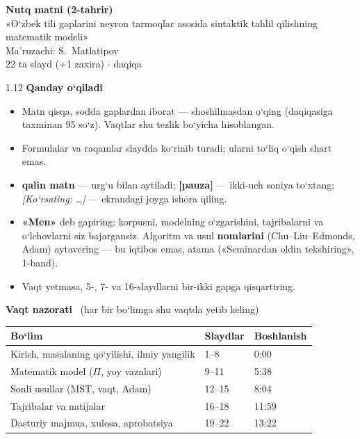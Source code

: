 \documentclass[14pt,a4paper]{extarticle}
\begin{document}
\begin{center}
  {\LARGE\bfseries Nutq matni (2-tahrir)}\\[0.3em]
  {\large «O‘zbek tili gaplarini neyron tarmoqlar asosida sintaktik tahlil
  qilishning matematik modeli»}\\[0.3em]
  {\normalsize Ma’ruzachi: S.~Matlatipov\\
  22 ta slayd (+1 zaxira) \quad$\cdot$ daqiqa}
\end{center}

\begin{spacing}{1.12}
\noindent\textbf{Qanday o‘qiladi}
\begin{itemize}[itemsep=1pt]
  \item Matn qisqa, sodda gaplardan iborat --- shoshilmasdan o‘qing (daqiqasiga
        taxminan 95 so‘z). Vaqtlar shu tezlik bo‘yicha hisoblangan.
  \item Formulalar va raqamlar slaydda ko‘rinib turadi; ularni to‘liq o‘qish shart emas.
  \item \textbf{qalin matn} --- urg‘u bilan aytiladi;
        \textbf{[pauza]} --- ikki-uch soniya to‘xtang;
        {\small\itshape [Ko‘rsating: \dots]} --- ekrandagi joyga ishora qiling.
  \item \textbf{«Men»} deb gapiring: korpusni, modelning o‘zgarishini, tajribalarni va
        o‘lchovlarni siz bajargansiz. Algoritm va usul \textbf{nomlarini} (Chu--Liu--Edmonds,
        Adam) aytavering --- bu iqtibos emas, atama («Seminardan oldin tekshiring», 1-band).
  \item Vaqt yetmasa, 5-, 7- va 16-slaydlarni bir-ikki gapga qisqartiring.
\end{itemize}

\noindent\textbf{Vaqt nazorati} \ {\small (har bir bo‘limga shu vaqtda yetib keling)}\\[2pt]
\begin{tabular}{@{}lll@{}}
  \toprule
  Bo‘lim & Slaydlar & Boshlanish\\
  \midrule
  Kirish, masalaning qo‘yilishi, ilmiy yangilik & 1--8 & 0:00\\
  Matematik model ($\Pi$, yoy vaznlari) & 9--11 & 5:38\\
  Sonli usullar (MST, vaqt, Adam) & 12--15 & 8:04\\
  Tajribalar va natijalar & 16--18 & 11:59\\
  Dasturiy majmua, xulosa, aprobatsiya & 19--22 & 13:22\\
  \bottomrule
\end{tabular}


\end{spacing}
\end{document}
